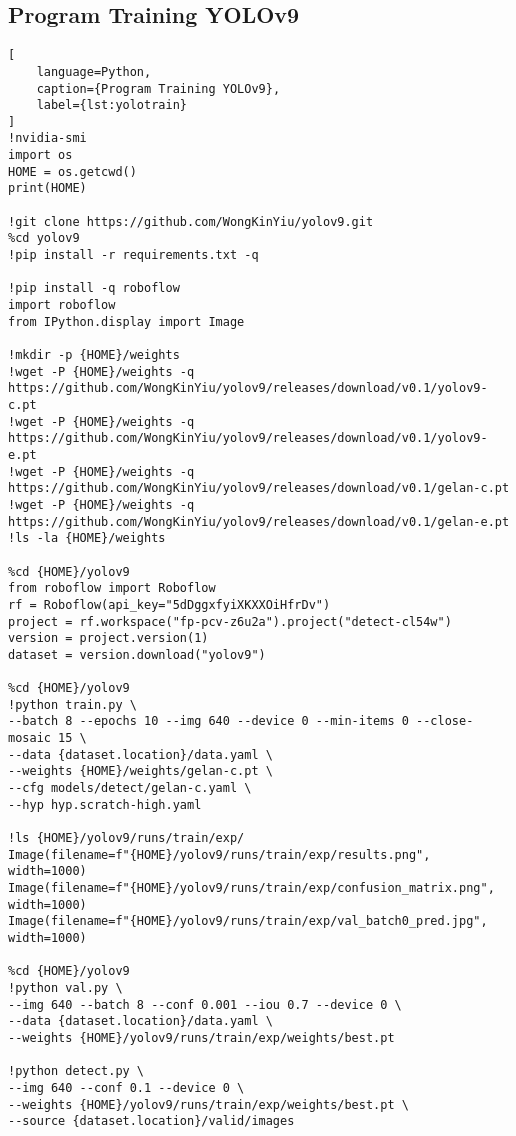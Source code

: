 \subsection*{Program Training YOLOv9}
\begin{lstlisting}[
    language=Python,
    caption={Program Training YOLOv9},
    label={lst:yolotrain}
]
!nvidia-smi
import os
HOME = os.getcwd()
print(HOME)

!git clone https://github.com/WongKinYiu/yolov9.git
%cd yolov9
!pip install -r requirements.txt -q

!pip install -q roboflow
import roboflow
from IPython.display import Image

!mkdir -p {HOME}/weights
!wget -P {HOME}/weights -q https://github.com/WongKinYiu/yolov9/releases/download/v0.1/yolov9-c.pt
!wget -P {HOME}/weights -q https://github.com/WongKinYiu/yolov9/releases/download/v0.1/yolov9-e.pt
!wget -P {HOME}/weights -q https://github.com/WongKinYiu/yolov9/releases/download/v0.1/gelan-c.pt
!wget -P {HOME}/weights -q https://github.com/WongKinYiu/yolov9/releases/download/v0.1/gelan-e.pt
!ls -la {HOME}/weights

%cd {HOME}/yolov9
from roboflow import Roboflow
rf = Roboflow(api_key="5dDggxfyiXKXXOiHfrDv")
project = rf.workspace("fp-pcv-z6u2a").project("detect-cl54w")
version = project.version(1)
dataset = version.download("yolov9")

%cd {HOME}/yolov9
!python train.py \
--batch 8 --epochs 10 --img 640 --device 0 --min-items 0 --close-mosaic 15 \
--data {dataset.location}/data.yaml \
--weights {HOME}/weights/gelan-c.pt \
--cfg models/detect/gelan-c.yaml \
--hyp hyp.scratch-high.yaml

!ls {HOME}/yolov9/runs/train/exp/
Image(filename=f"{HOME}/yolov9/runs/train/exp/results.png", width=1000)
Image(filename=f"{HOME}/yolov9/runs/train/exp/confusion_matrix.png", width=1000)
Image(filename=f"{HOME}/yolov9/runs/train/exp/val_batch0_pred.jpg", width=1000)

%cd {HOME}/yolov9
!python val.py \
--img 640 --batch 8 --conf 0.001 --iou 0.7 --device 0 \
--data {dataset.location}/data.yaml \
--weights {HOME}/yolov9/runs/train/exp/weights/best.pt

!python detect.py \
--img 640 --conf 0.1 --device 0 \
--weights {HOME}/yolov9/runs/train/exp/weights/best.pt \
--source {dataset.location}/valid/images
\end{lstlisting}

